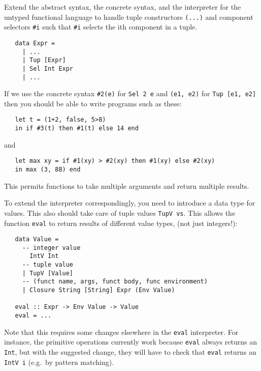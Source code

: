 \documentclass[a4paper]{article}
\begin{document}
\begin{exercise}\label{exer-fun-tuples-eval}
  Extend the abstract syntax, the concrete syntax, and the interpreter
  for the untyped functional language to handle tuple constructors
  \texttt{(...)} and component selectors \verb+#i+ such that \verb+#i+ selects the ith component in a tuple.

{\codesetup\begin{verbatim}
   data Expr = 
     | ...
     | Tup [Expr] 
     | Sel Int Expr
     | ...
\end{verbatim}}

\noindent
If we use the concrete syntax \verb+#2(e)+ for \texttt{Sel 2 e} and
\texttt{(e1, e2)} for \texttt{Tup [e1, e2]} then you should be able to
write programs such as these:

{\codesetup\begin{verbatim}
   let t = (1+2, false, 5>8)
   in if #3(t) then #1(t) else 14 end
\end{verbatim}}

\noindent
and

{\codesetup\begin{verbatim}
   let max xy = if #1(xy) > #2(xy) then #1(xy) else #2(xy) 
   in max (3, 88) end
\end{verbatim}}

\noindent
This permits functions to take multiple arguments and return multiple
results.

To extend the interpreter correspondingly, you need to introduce a data type for values. This also should take care of tuple values \texttt{TupV vs}. This allows the function
\texttt{eval} to return results of different value types, (not just integers!):


{\codesetup\begin{verbatim}
   data Value = 
     -- integer value
       IntV Int     
     -- tuple value
     | TupV [Value]
     -- (funct name, args, funct body, func environment)
     | Closure String [String] Expr (Env Value) 
   
   eval :: Expr -> Env Value -> Value
   eval = ...
\end{verbatim}}

\noindent 
Note that this requires some changes elsewhere in the \texttt{eval}
interpreter.  For instance, the primitive operations currently work
because \texttt{eval} always returns an \texttt{Int}, but with the
suggested change, they will have to check that \texttt{eval} returns
an \texttt{IntV i} (e.g.\ by pattern matching).\\


\end{exercise}
\end{document}
